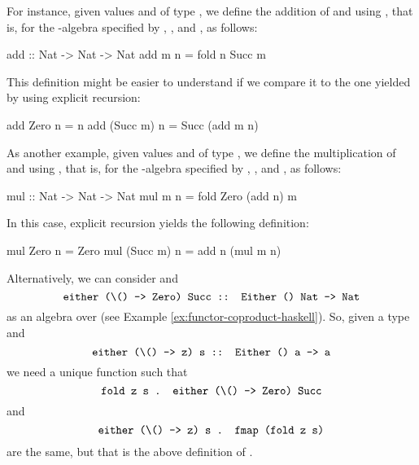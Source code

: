 \begin{example}
  For instance, given values  and  of
  type , we define the addition of 
  and  using , that is,
   for the -algebra specified by
  , , and , as
  follows:
  \begin{codehaskell}
add :: Nat -> Nat -> Nat
add m n = fold n Succ m
  \end{codehaskell}
  This definition might be easier to understand if we compare it to
  the one yielded by using explicit recursion:
  \begin{codehaskell}
add Zero     n = n
add (Succ m) n = Succ (add m n)
  \end{codehaskell}

  As another example, given values  and 
  of type , we define the multiplication of
   and  using , that is,  for the
  -algebra specified by ,
  , and , as follows:
  \begin{codehaskell}
mul :: Nat -> Nat -> Nat
mul m n = fold Zero (add n) m
  \end{codehaskell}
  In this case, explicit recursion yields the following definition:
  \begin{codehaskell}
mul Zero     n = Zero
mul (Succ m) n = add n (mul m n)
  \end{codehaskell}

\end{example}

Alternatively, we can consider  and
\begin{equation*}
  \text{\texttt{either (\textbackslash () -> Zero) Succ :: Either () Nat -> Nat}}
\end{equation*}
as an algebra over  (see Example
\ref{ex:functor-coproduct-haskell}). So, given a type 
and
\begin{equation*}
  \text{\texttt{either (\textbackslash () -> z) s :: Either () a -> a}}
\end{equation*}
we need a unique function  such that
\begin{equation*}
  \text{\texttt{fold z s . either (\textbackslash () -> Zero) Succ}}
\end{equation*}
and
\begin{equation*}
  \text{\texttt{either (\textbackslash () -> z) s . fmap (fold z s)}}
\end{equation*}
are the same, but that is the above definition of .

